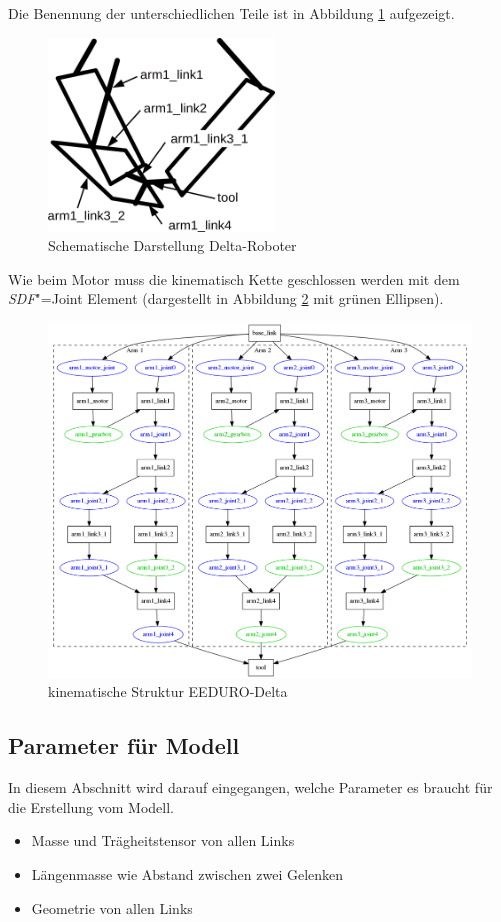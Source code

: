 Die Benennung der unterschiedlichen Teile ist in Abbildung \ref{Ab:delta-schematisch} aufgezeigt.

\begin{figure}[ht!]
	\centering
	\includegraphics[width=6cm]{images/delta.png}
	\caption{Schematische Darstellung Delta-Roboter}
	\label{Ab:delta-schematisch}
\end{figure}

Wie beim Motor muss die kinematisch Kette geschlossen werden mit dem \textit{SDF}"=Joint Element (dargestellt in Abbildung \ref{Ab:delta-struktur} mit grünen Ellipsen).

\begin{figure}[ht!]
	\centering
	\includegraphics[width=14.5cm]{images/delta_struktur.png}
	\caption{kinematische Struktur EEDURO-Delta}
	\label{Ab:delta-struktur}
\end{figure}

\subsection{Parameter für Modell}
In diesem Abschnitt wird darauf eingegangen, welche Parameter es braucht für die Erstellung vom Modell.
\begin{itemize}
\item Masse und Trägheitstensor von allen Links
\item Längenmasse wie Abstand zwischen zwei Gelenken
\item Geometrie von allen Links
\end{itemize}

